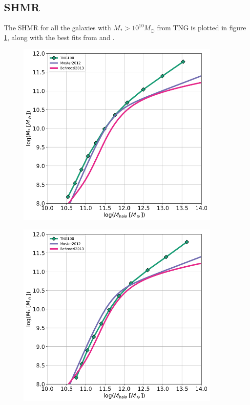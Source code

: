 
\subsection{SHMR}
The SHMR for all the galaxies with $M_{*} > 10^10 M_{\odot}$ from TNG is plotted in figure \ref{shmr_res1}, along with the best fits from \cite{Moster2012} and \cite{Behroozi2013}.



\begin{figure}
    \centering
    \includegraphics[width=0.9\textwidth]{images/results_shmr_all_galaxies.png}
    \caption{}
    \label{shmr_res1}
\end{figure}

\begin{figure}
    \centering
    \includegraphics[width=0.9\textwidth]{images/results_shmr_central_galaxies.png}
    \caption{}
    \label{shmr_res2}
\end{figure}

